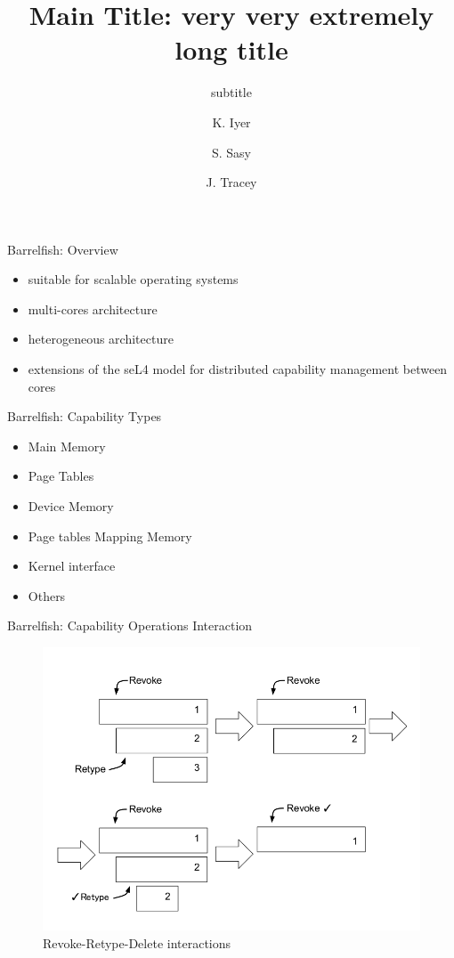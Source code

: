 \documentclass[11pt]{beamer}
\title[Main Title]{Main Title: very very extremely long title}
\subtitle{subtitle}
\author[k4iyer, ssasy, j3tracey]{K. Iyer \and S. Sasy \and J. Tracey}
\institute[]{Cheriton School of Computer Science}
\date{}
\begin{document}
\begin{frame}
  \titlepage
\end{frame}

\begin{frame}{Barrelfish: Overview}
	\begin{itemize}

	\item suitable for scalable operating systems 
		\vfill
	\item multi-cores architecture
		\vfill
	\item heterogeneous architecture
		\vfill
	\item extensions of the seL4 model for distributed capability management between cores
	\end{itemize}
\end{frame}


\begin{frame}{Barrelfish: Capability Types}
\begin{itemize}
\item Main Memory
\vfill
\item Page Tables 
\vfill
\item Device Memory
\vfill
\item Page tables Mapping Memory 
\vfill
\item Kernel interface
\vfill
\item Others
\end{itemize}
\end{frame}


\begin{frame}{Barrelfish: Capability Operations Interaction}
\begin{figure}
		  \includegraphics[scale=0.25]{img/BF_revoke_retype}
		  \caption{Revoke-Retype-Delete interactions}
		  
    \end{figure}   
\end{frame}
\end{document}
